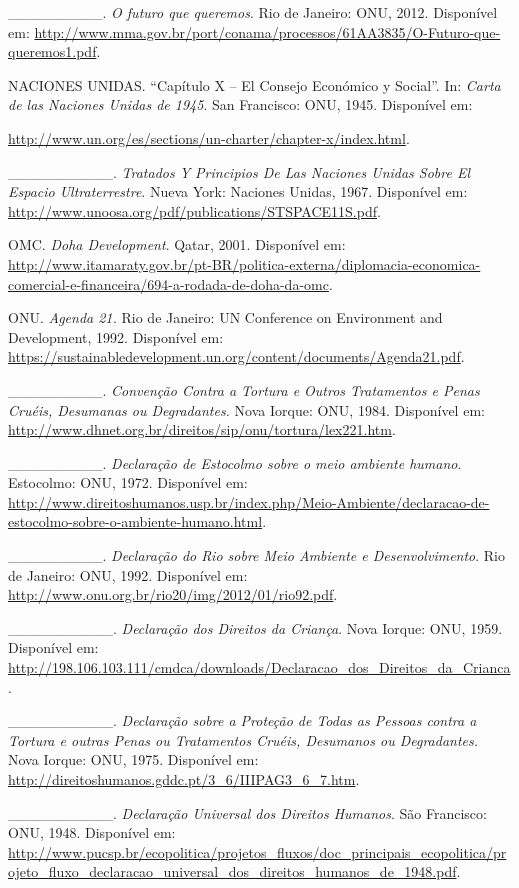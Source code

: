 \_\_\_\_\_\_\_\_\_. \emph{O futuro que queremos}. Rio de Janeiro: ONU,
2012. Disponível em:
\url{http://www.mma.gov.br/port/conama/processos/61AA3835/O-Futuro-que-queremos1.pdf}.

NACIONES UNIDAS. ``Capítulo X -- El Consejo Económico y Social''. In:
\emph{Carta de las Naciones Unidas de 1945}. San Francisco: ONU, 1945.
Disponível em:

\url{http://www.un.org/es/sections/un-charter/chapter-x/index.html}.

\_\_\_\_\_\_\_\_\_\_. \emph{Tratados Y Principios De Las Naciones Unidas
Sobre El Espacio Ultraterrestre}. Nueva York: Naciones Unidas, 1967.
Disponível em:
\url{http://www.unoosa.org/pdf/publications/STSPACE11S.pdf}.

OMC. \emph{Doha Development}. Qatar, 2001. Disponível em:
\url{http://www.itamaraty.gov.br/pt-BR/politica-externa/diplomacia-economica-comercial-e-financeira/694-a-rodada-de-doha-da-omc}.

ONU. \emph{Agenda 21.} Rio de Janeiro: UN Conference on Environment and
Development, 1992. Disponível em:
\url{https://sustainabledevelopment.un.org/content/documents/Agenda21.pdf}.

\_\_\_\_\_\_\_\_\_. \emph{Convenção Contra a Tortura e Outros
Tratamentos e Penas Cruéis, Desumanas ou Degradantes.} Nova Iorque: ONU,
1984. Disponível em:
\url{http://www.dhnet.org.br/direitos/sip/onu/tortura/lex221.htm}.

\_\_\_\_\_\_\_\_\_. \emph{Declaração de Estocolmo sobre o meio ambiente
humano}. Estocolmo: ONU, 1972. Disponível em:
\url{http://www.direitoshumanos.usp.br/index.php/Meio-Ambiente/declaracao-de-estocolmo-sobre-o-ambiente-humano.html}.

\_\_\_\_\_\_\_\_\_. \emph{Declaração do Rio sobre Meio Ambiente e
Desenvolvimento}. Rio de Janeiro: ONU, 1992. Disponível em:
\url{http://www.onu.org.br/rio20/img/2012/01/rio92.pdf}.

\_\_\_\_\_\_\_\_\_\_. \emph{Declaração dos Direitos da Criança}. Nova
Iorque: ONU, 1959. Disponível em:
\url{http://198.106.103.111/cmdca/downloads/Declaracao_dos_Direitos_da_Crianca}.

\_\_\_\_\_\_\_\_\_\_. \emph{Declaração sobre a Proteção de Todas as
Pessoas contra a Tortura e outras Penas ou Tratamentos Cruéis, Desumanos
ou Degradantes.} Nova Iorque: ONU, 1975. Disponível em:
\url{http://direitoshumanos.gddc.pt/3_6/IIIPAG3_6_7.htm}.

\_\_\_\_\_\_\_\_\_\_. \emph{Declaração Universal dos Direitos Humanos}.
São Francisco: ONU, 1948. Disponível em:
\url{http://www.pucsp.br/ecopolitica/projetos_fluxos/doc_principais_ecopolitica/projeto_fluxo_declaracao_universal_dos_direitos_humanos_de_1948.pdf}{.}

